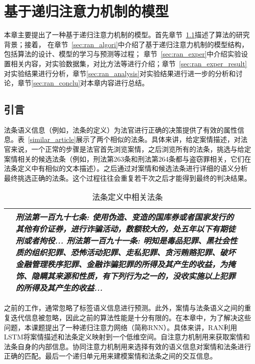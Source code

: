 
\chapter{基于递归注意力机制的模型}
本章主要提出了一种基于递归注意力机制的模型。首先章节~\ref{sec:ran_intro}描述了算法的研究背景；接着，
在章节~\ref{sec:ran_algori}中介绍了基于递归注意力机制的模型结构，包括算法的设计、模型的学习与预测等过程；
章节~\ref{sec:ran_exper}中介绍实验设置相关内容，对实验数据集，对比方法等进行介绍；章节~\ref{sec:ran_exper_result}
对实验结果进行分析，章节\ref{sec:ran_analysis}对实验结果进行进一步的分析和讨论，章节\ref{sec:ran_conclu}对本章内容进行总结。

\section{引言}
\label{sec:ran_intro}
法条语义信息（例如，法条的定义）为法官进行正确的决策提供了有效的属性信息。表~\ref{similar_article}展示了两个相似的法条。具体来讲，给定案情描述，对法官来说，一个正常的步骤是法官首先浏览案情，之后浏览所有的法条，挑选与给定案情相关的候选法条（例如，刑法第263条和刑法第264条都与盗窃罪相关，它们在法条定义中有相似的文本描述）。之后通过对案情和候选法条进行详细的语义分析最终挑选正确的法条。这个过程往往会重复若干次之后才能得到最终的判决结果。

\begin{table}[t!]
    \caption{法条定义中相关法条}
    \label{t:similar_article}
    \centering
    \begin{tabular}{lp{12cm}p{7cm}}
    \hline
    &\emph{\textbf{刑法第一百九十七条}: 使用伪造、变造的国库券或者国家发行的其他有价证券，进行\emph{\textbf{诈骗}}活动，数额较大的，处五年以下有期徒刑或者拘役... \newline
    \textbf{刑法第一百九十一条}: 明知是毒品犯罪、黑社会性质的组织犯罪、恐怖活动犯罪、走私犯罪、贪污贿赂犯罪、破坏金融管理秩序犯罪、\emph{\textbf{金融诈骗}}犯罪的所得及其产生的收益，为掩饰、隐瞒其来源和性质，有下列行为之一的，没收实施以上犯罪的所得及其产生的收益...}\\
    \hline
    \end{tabular}
\end{table}

之前的工作，通常忽略了标签语义信息进行预测。此外，案情与法条语义之间的重复迭代信息被忽略，因此之前的算法性能是十分有限的。在本章中，为了解决这些问题，本课题提出了一种递归注意力网络（简称RNN）。具体来讲，RAN利用LSTM将案情描述和法条定义映射到一个低维空间。自注意力机制用来获取案情和法条自身的内部信息。协同注意力机制用来选择有效的语义信息对案情和法条进行正确的匹配。最后一个递归单元用来建模案情和法条之间的交互信息。


